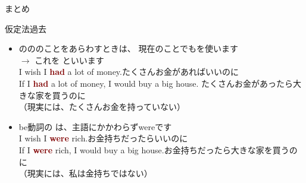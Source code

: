 \documentclass[aspectratio=169,xcolor={dvipsnames,table}]{beamer}
\begin{document}
\begin{frame}[plain]{まとめ}
 \begin{block}{仮定法過去}
\small

\begin{itemize}[square]
 \item {}のののことをあらわすときは、
現在のことでもを使います\\
\hfill{}$\longrightarrow$ これを\,\,といいます\\
\hfill{}I wish I \textcolor{Maroon}{{\bfseries had}} a lot of money.{\scriptsize たくさんお金があればいいのに}\\
\hfill{}If I \textcolor{Maroon}{{\bfseries had}} a lot of money, I would buy a big house.
\hfill{\scriptsize たくさんお金があったら大きな家を買うのに}\\
\hfill{\scriptsize （現実には、たくさんお金を持っていない）}\\
\mbox{}
 \item be動詞の\,\,は、主語にかかわらずwereです\\
\hfill{}I wish I \textcolor{Maroon}{{\bfseries were}} rich.{\scriptsize お金持ちだったらいいのに}\\
\hfill{}If I \textcolor{Maroon}{{\bfseries were}} rich, I would buy a big house.{\scriptsize お金持ちだったら大きな家を買うのに}\\
\hfill{\scriptsize （現実には、私は金持ちではない）}
\end{itemize}
\end{block}
\end{frame}
\end{document}
